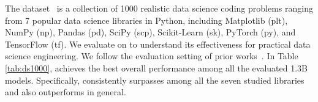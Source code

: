 The \dsonek dataset~\cite{lai2022ds1000} is a collection of 1000 realistic data science coding problems ranging from 7 popular data science libraries in Python, including Matplotlib (plt), NumPy (np), Pandas (pd), SciPy (scp), Scikit-Learn (sk), PyTorch (py), and TensorFlow (tf). 
We evaluate \ours on \dsonek{} to understand its effectiveness for practical data science engineering. 
We follow the evaluation setting of prior works~\cite{guo2024deepseekcoder, wei2023magicoder}. 
In Table \ref{tab:ds1000}, \oursmerge achieves the best overall performance among all the evaluated 1.3B models. 
Specifically, \oursmerge consistently surpasses \baselineds among all the seven studied libraries and also outperforms \ewads in general.


